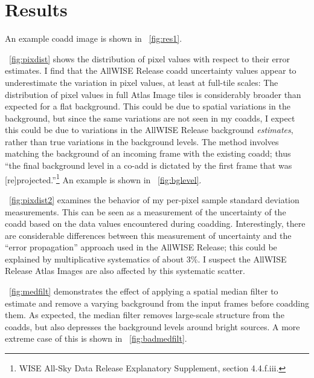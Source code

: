 \documentclass[11pt,preprint]{aastex}
\newcommand{\figref}[1]{\figurename~\ref{#1}}
\newcommand{\Figref}[1]{\figref{#1}}
\begin{document}
\section{Results}
\label{sec:results}

An example coadd image is shown in \figref{fig:res1}.
%

\Figref{fig:pixdist} shows the distribution of pixel values with
respect to their error estimates.  I find that the AllWISE Release
coadd uncertainty values appear to underestimate the variation in
pixel values, at least at full-tile scales: The distribution of pixel
values in full Atlas Image tiles is considerably broader than expected
for a flat background.  This could be due to spatial variations in the
background, but since the same variations are not seen in my coadds,
I expect this could be due to variations in the AllWISE Release
background \emph{estimates}, rather than true variations in the
background levels.  The method involves matching the background of an
incoming frame with the existing coadd; thus ``the final background
level in a co-add is dictated by the first frame that was
[re]projected.''\footnote{WISE All-Sky Data Release Explanatory
  Supplement, section 4.4.f.iii.}  An example is shown in
\figref{fig:bglevel}.

\Figref{fig:pixdist2} examines the behavior of my per-pixel sample
standard deviation measurements.  This can be seen as a measurement of
the uncertainty of the coadd based on the data values encountered
during coadding.  Interestingly, there are considerable differences
between this measurement of uncertainty and the ``error propagation''
approach used in the AllWISE Release; this could be explained by
multiplicative systematics of about 3\%.  I suspect the AllWISE
Release Atlas Images are also affected by this systematic scatter.

\Figref{fig:medfilt} demonstrates the effect of applying a spatial
median filter to estimate and remove a varying background from the
input frames before coadding them.  
%
As expected, the median filter removes large-scale structure from the
coadds, but also depresses the background levels around bright
sources.  A more extreme case of this is shown in
\figref{fig:badmedfilt}.
%

\end{document}
